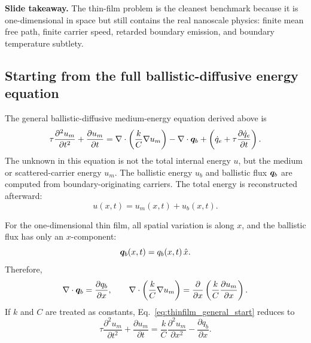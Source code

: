 \documentclass[11pt]{article}
\begin{document}
\begin{notebox}
\textbf{Slide takeaway.} The thin-film problem is the cleanest benchmark because it is one-dimensional in space but still contains the real nanoscale physics: finite mean free path, finite carrier speed, retarded boundary emission, and boundary temperature subtlety.
\end{notebox}

\subsection{Starting from the full ballistic-diffusive energy equation}
The general ballistic-diffusive medium-energy equation derived above is
\begin{equation}
    \tau\frac{\partial^2u_m}{\partial t^2}
    +\frac{\partial u_m}{\partial t}
    =\nabla\cdot\left(\frac{k}{C}\nabla u_m\right)
    -\nabla\cdot\bm{q}_b
    +\left(\dot{q}_e+\tau\frac{\partial \dot{q}_e}{\partial t}\right).
    \label{eq:thinfilm_general_start}
\end{equation}
The unknown in this equation is not the total internal energy \(u\), but the medium or scattered-carrier energy \(u_m\). The ballistic energy \(u_b\) and ballistic flux \(\bm{q}_b\) are computed from boundary-originating carriers. The total energy is reconstructed afterward:
\begin{equation}
    u(x,t)=u_m(x,t)+u_b(x,t).
\end{equation}

For the one-dimensional thin film, all spatial variation is along \(x\), and the ballistic flux has only an \(x\)-component:
\begin{equation}
    \bm{q}_b(x,t)=q_b(x,t)\,\hat{x}.
\end{equation}
Therefore,
\begin{equation}
    \nabla\cdot\bm{q}_b=\frac{\partial q_b}{\partial x},
    \qquad
    \nabla\cdot\left(\frac{k}{C}\nabla u_m\right)
    =\frac{\partial}{\partial x}\left(\frac{k}{C}\frac{\partial u_m}{\partial x}\right).
\end{equation}
If \(k\) and \(C\) are treated as constants, Eq.~\eqref{eq:thinfilm_general_start} reduces to
\begin{equation}
    \boxed{\tau\frac{\partial^2u_m}{\partial t^2}+\frac{\partial u_m}{\partial t}
    =\frac{k}{C}\frac{\partial^2u_m}{\partial x^2}-\frac{\partial q_b}{\partial x}.}
    \label{eq:bd_1d_dimensional_expanded}
\end{equation}
\end{document}
